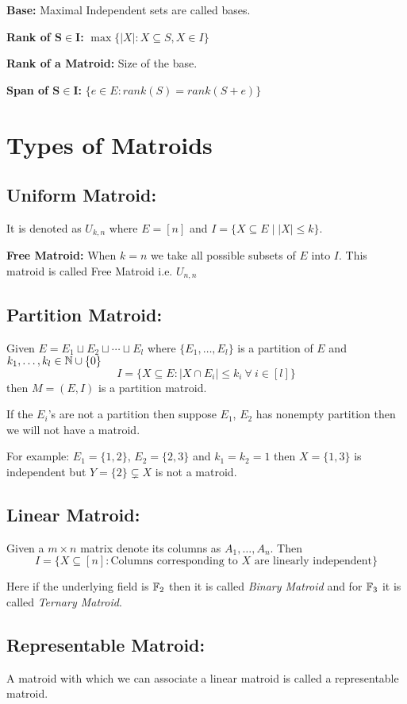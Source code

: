 \documentclass[twoside]{article}
\begin{document}
\textbf{Base:} Maximal Independent sets are called bases.

\textbf{Rank of $\boldsymbol{S\in I}$:} $\max\{|X|\colon X\subseteq S, X\in I\}$

\textbf{Rank of a Matroid:} Size of the base.

\textbf{Span of $\boldsymbol{S\in I}$:} $\{e\in E\colon rank(S)=rank(S+e)\}$

\section{Types of Matroids}
	\subsection{{Uniform Matroid:} }It is {denoted as $U_{k,n}$ where $E=[n]$ and $I=\{X\subseteq E\mid |X|\leq k\}$.}
	
	
	\textbf{Free Matroid: }When $k=n$ we take all possible subsets of $E$ into $I$. This matroid is called {Free Matroid} i.e. $U_{n,n}$\parinn
	
	\subsection{Partition Matroid:} Given $E=E_1\sqcup E_2\sqcup \cdots \sqcup E_l$ where $\{E_1,\dots, E_l\}$ is a partition of $E$ and $k_1,\dots,k_l\in \mathbb{N}\cup \{0\}$ $$I=\{X\subseteq E\colon |X\cap E_i|\leq k_i\ \forall \ i\in[l]\}$$then $M=(E,I)$ is a partition matroid.
	\begin{note}
		If the $E_i$'s are not a partition then suppose $E_1$, $E_2$ has nonempty partition then we will not have a matroid. 
		
		For example: $E_1=\{1,2\}$, $E_2=\{2,3\}$ and $k_1=k_2=1$ then $X=\{1,3\}$ is independent but $Y=\{2\}\subsetneq X$ is not a matroid. 
	\end{note}
	
	\subsection{Linear Matroid:} Given a $m\times n$ matrix denote its columns as $A_1,\dots, A_n$. Then $$I=\{ X\subseteq [n]\colon \text{Columns corresponding to $X$ are linearly independent}  \}$$\parinn
	
	Here if the underlying field is $\mathbb{F}_2$ then it is called \textit{Binary Matroid} and for $\mathbb{F}_3$ it is called \textit{Ternary Matroid}.
	
	\subsection{Representable Matroid:} A matroid with which we can associate a linear matroid is called a representable matroid.
	
\end{document}
